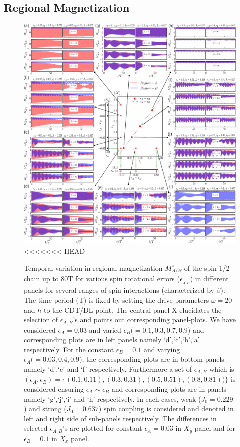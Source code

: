 \documentclass[12pt]{iopart}
\begin{document}
\subsection{\label{sec:level42} Regional Magnetization}
\begin{figure}[t]
	\centering
	\includegraphics[width = 15.0cm]{figure8.pdf}
<<<<<<< HEAD
	\caption{Temporal variation in regional magnetization $M^z_{A/B}$ of the spin-1/2 chain up to 80T for various spin rotational errors ($\epsilon_{_{A,B}}$) in different panels for  several ranges of spin interactions (characterized by $\beta$). The time period (T) is fixed by setting the drive parameters $\omega=20$ and $h$ to the CDT/DL point. The central panel-X elucidates the selection of $\epsilon_{A,B}$'s and points out corresponding panel-plots. We have considered $\epsilon_A = 0.03$ and varied $\epsilon_B(= 0.1, 0.3, 0.7,0.9$) and corresponding plots are in left panels namely `d',`c',`b',`a' respectively.  For the constant $\epsilon_B = 0.1$ and varying $\epsilon_A ( = 0.03, 0.4,0.9$), the corresponding plots are in bottom panels namely `d',`e' and `f' respectively. Furthermore a set of $\epsilon_{A,B}$ which is $ (\epsilon_{A},\epsilon_{B}) = \{(0.1,0.11), (0.3,0.31),(0.5,0.51),(0.8,0.81))\}$ is considered ensuring $\epsilon_A\sim \epsilon_B$ and corresponding plots are in panels namely `g',`j',`i' and `h' respectively. In each cases, weak ($J_0 = 0.229$) and strong ($J_0 = 0.637$) spin coupling  is considered and denoted in left and right side of sub-panels respectively. The differences in selected $\epsilon_{A,B}$'s are plotted for constant $\epsilon_A = 0.03$ in $X_y$ panel and for $\epsilon_B = 0.1$ in $X_x$ panel.}
	\label{Fig:reg_mag_ea_eb}
\end{figure}
\end{document}
